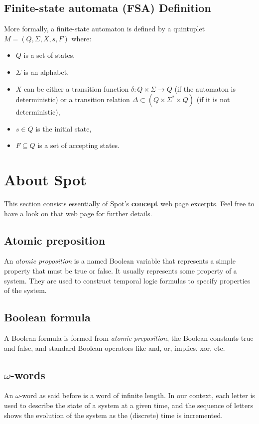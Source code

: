 \subsection{Finite-state automata (FSA) Definition}
More formally, a finite-state automaton is defined by a quintuplet $M=(Q, \Sigma, X, s, F)$ where:
\begin{itemize}
 \item $Q$ is a set of states,
 \item $\Sigma$ is an alphabet,
 \item $X$ can be either a transition function $\delta : Q \times \Sigma \rightarrow Q$ (if the automaton is
       deterministic) or a transition relation $\Delta \subset (Q \times \Sigma^* \times Q)$ (if it is not
       deterministic),
 \item $s \in Q$ is the initial state,
 \item $F \subseteq Q$ is a set of accepting states.
\end{itemize}

\section{About Spot}
This section consists essentially of Spot's \textbf{concept} web page excerpts\cite{8}. Feel free to have a
look on that web page for further details.

\subsection{Atomic preposition}
An \textit{atomic proposition} is a named Boolean variable that represents a simple property that must be
true or false. It usually represents some property of a system. They are used to construct temporal logic
formulas\cite{13} to specify properties of the system.

\subsection{Boolean formula}
A Boolean formula is formed from \textit{atomic preposition}, the Boolean constants true and false, and
standard Boolean operators like and, or, implies, xor, etc.

\subsection{$\omega$-words}
An $\omega$-word as said before is a word of infinite length. In our context, each letter is used to
describe the state of a system at a given time, and the sequence of letters shows the evolution of the
system as the (discrete) time is incremented.\\

